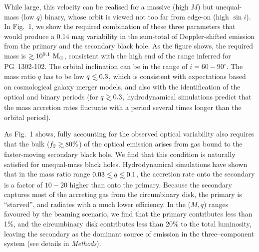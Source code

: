 While large, this velocity can be realised for a massive (high $M$)
but unequal-mass (low $q$) binary, whose orbit is viewed not too far
from edge-on (high $\sin i$).  In Fig.~1, we show the required
combination of these three parameters that would produce a 0.14 mag
variability in the sum-total of Doppler-shifted emission from the
primary and the secondary black hole.  As the figure shows, the
required mass is $\gsim 10^{9.1}~{\rm M_\odot}$, consistent with the
high end of the range inferred for PG~1302-102.  The orbital
inclination can be in the range of $i=60-90^\circ$.  The mass ratio
$q$ has to be low $q\lsim 0.3$, which is consistent with expectations
based on cosmological galaxy merger models\cite{Volonteri+2003}, and
also with the identification of the optical and binary periods (for
$q\gsim 0.3$, hydrodynamical simulations predict that the mass
accretion rates fluctuate with a period several times longer than the
orbital period\cite{PG1302-Dan}).

As Fig.~1 shows, fully accounting for the observed optical variability
also requires that the bulk ($f_2\gsim 80\%$) of the optical emission
arises from gas bound to the faster-moving secondary black hole. We
find that this condition is naturally satisfied for unequal-mass black
holes. Hydrodynamical simulations have shown that in the mass ratio
range $0.03\lsim q\lsim 0.1$, the accretion rate onto the secondary is
a factor of $10-20$ higher than onto the primary\cite{Farris+2014}.
Because the secondary captures most of the accreting gas from the
circumbinary disk, the primary is ``starved'', and radiates with a
much lower efficiency.  In the ($M,q$) ranges favoured by the beaming
scenario, we find that the primary contributes less than 1\%, and the
circumbinary disk contributes less than 20\% to the total luminosity,
leaving the secondary as the dominant source of emission in the
three--component system (see details in {\it Methods}).

